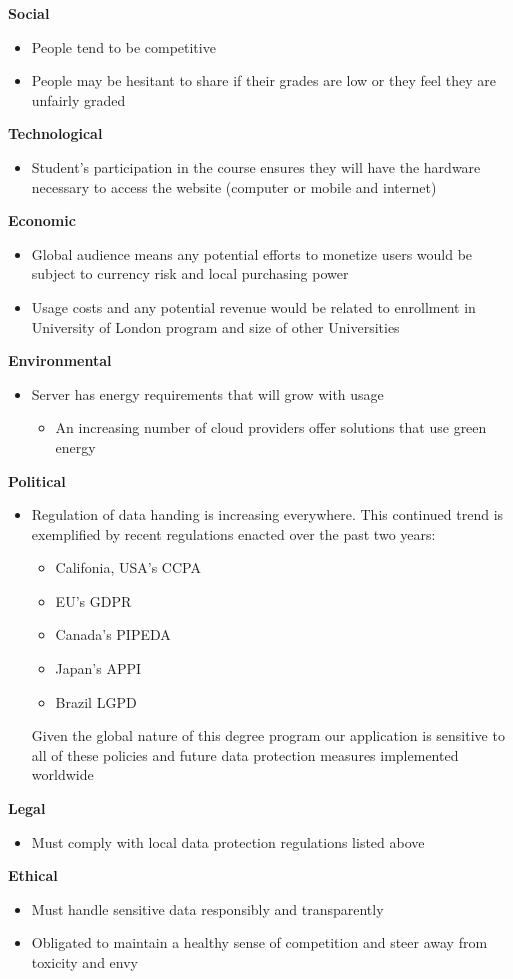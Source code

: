 \noindent \textbf{Social}
\begin{itemize}
    \item People tend to be competitive \cite{hutson_2015}
    \item People may be hesitant to share if their grades are low or they feel they are unfairly graded
\end{itemize}
\textbf{Technological}
\begin{itemize}
    \item Student's participation in the course ensures they will have the hardware necessary to access the website (computer or mobile and internet)
\end{itemize}
\textbf{Economic}
\begin{itemize}
    \item Global audience means any potential efforts to monetize users would be subject to currency risk and local purchasing power
    \item Usage costs and any potential revenue would be related to enrollment in University of London program and size of other Universities
\end{itemize}
\textbf{Environmental}
\begin{itemize}
    \item Server has energy requirements that will grow with usage
    \begin{itemize}
        \item An increasing number of cloud providers offer solutions that use green energy
\end{itemize}
\end{itemize}
\textbf{Political}
\begin{itemize}
    \item Regulation of data handing is increasing everywhere. This continued trend is exemplified by recent regulations enacted over the past two years:
    \begin{itemize}
        \item Califonia, USA's CCPA
        \item EU's GDPR
        \item Canada's PIPEDA
        \item Japan's APPI 
        \item Brazil LGPD
    \end{itemize}
    Given the global nature of this degree program our application is sensitive to all of these policies and future data protection measures implemented worldwide
\end{itemize}
\textbf{Legal}
\begin{itemize}
    \item Must comply with local data protection regulations listed above
\end{itemize}
\textbf{Ethical}
\begin{itemize}
    \item Must handle sensitive data responsibly and transparently
    \item Obligated to maintain a healthy sense of competition and steer away from toxicity and envy
\end{itemize}
\bigskip

